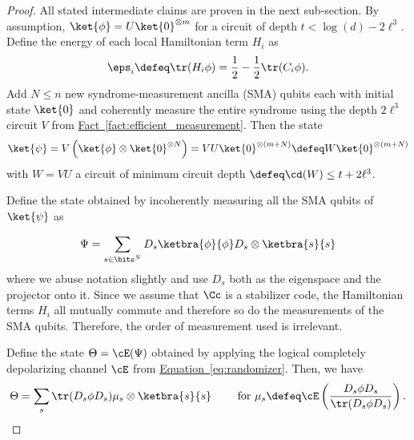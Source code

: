\documentclass[11pt]{article}
\newcommand{\expref}[2]{\texorpdfstring{\hyperref[#2]{#1~\ref{#2}}}{#1~\ref{#2}}}
\newcommand{\expeqref}[2]{\texorpdfstring{\hyperref[#2]{#1~\eqref{#2}}}{#1~\eqref{#2}}}
\begin{document}
\begin{proof}
All stated intermediate claims are proven in the next sub-section. By assumption, $\ket{\phi} = U \ket{0}^{\otimes m}$ for a circuit of depth $t < \log(d) - 2 \ell^3$. Define the energy of each local Hamiltonian term $H_i$ as
\begin{align}
    \eps_i \defeq \tr(H_i \phi) = \frac{1}{2} - \frac{1}{2} \tr(C_i \phi).
\end{align}
Add $N \leq n$ new syndrome-measurement ancilla (SMA) qubits each with initial state $\ket{0}$ and coherently measure the entire syndrome using the depth $2 \ell^3$ circuit $V$ from \expref{Fact}{fact:efficient_measurement}. Then the state
\begin{align}
    \ket{\psi} = V \left(\ket{\phi} \otimes \ket{0}^{\otimes N}\right) = V U \ket{0}^{\otimes(m + N)} \defeq W \ket{0}^{\otimes (m + N)}
\end{align}
with $W = VU$ a circuit of minimum circuit depth $\defeq \cd(W) \leq t + 2 \ell^3$.

Define the state obtained by incoherently measuring all the SMA qubits of $\ket{\psi}$ as 

\begin{align}
    \Psi = \sum_{s \in \bits^{N}} D_s \ketbra{\phi}{\phi} D_s \otimes \ketbra{s}{s}
\end{align}
where we abuse notation slightly and use $D_s$ both as the eigenspace and the projector onto it. Since we assume that $\Cc$ is a stabilizer code, the Hamiltonian terms $H_i$ all mutually commute and therefore so do the measurements of the SMA qubits. Therefore, the order of measurement used is irrelevant.

Define the state $\Theta = \cE(\Psi)$ obtained by applying the logical completely depolarizing channel $\cE$ from \expeqref{Equation}{eq:randomizer}. Then, we have
\begin{align}
    \Theta = \sum_s \tr(D_s \phi D_s) \mu_s \otimes \ketbra{s}{s} \qquad \text{ for } \mu_s \defeq \cE \left( \frac{D_s \phi D_s}{\tr(D_s \phi D_s)} \right).
\end{align}


\end{proof}
\end{document}
